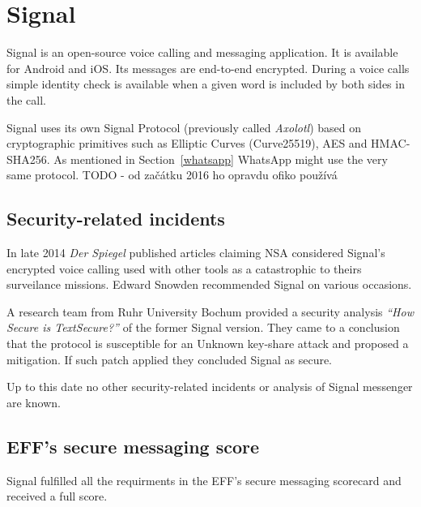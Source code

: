 \documentclass[thesis=M,english]{FITthesis}[2012/10/20]
\begin{document}
\section{Signal}

Signal is an open-source voice calling and messaging application. It is available for Android and iOS. Its messages are end-to-end encrypted. During a voice calls simple identity check is available when a given word is included by both sides in the call.

Signal uses its own Signal Protocol (previously called \emph{Axolotl}) based on cryptographic primitives such as Elliptic Curves (Curve25519), AES and HMAC-SHA256. \cite{signal-bochum} As mentioned in Section~\ref{whatsapp} WhatsApp might use the very same protocol. TODO - od začátku 2016 ho opravdu ofiko používá

\subsection{Security-related incidents}

In late 2014 \emph{Der Spiegel} published articles claiming NSA considered Signal's encrypted voice calling used with other tools as a catastrophic to theirs surveilance missions.\cite{signal-spiegel} Edward Snowden recommended Signal on various occasions.\cite{signal-snowden}\cite{signal-snowden2}

A research team from Ruhr University Bochum provided a security analysis \emph{``How Secure is TextSecure?''} of the former Signal version.\cite{signal-bochum} They came to a conclusion that the protocol is susceptible for an Unknown key-share attack and proposed a mitigation. If such patch applied they concluded Signal as secure.

Up to this date no other security-related incidents or analysis of Signal messenger are known.

\subsection{EFF's secure messaging score}

Signal fulfilled all the requirments in the EFF's secure messaging scorecard and received a full score. \cite{eff-score}
\end{document}

